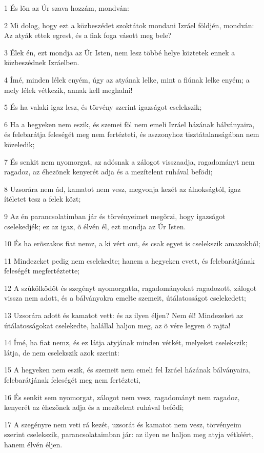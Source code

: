 \par 1 És lõn az Úr szava hozzám, mondván:
\par 2 Mi dolog, hogy ezt a közbeszédet szoktátok mondani Izráel földjén, mondván: Az atyák ettek egrest, és a fiak foga vásott meg bele?
\par 3 Élek én, ezt mondja az Úr Isten, nem lesz többé helye köztetek ennek a közbeszédnek Izráelben.
\par 4 Ímé, minden lélek enyém, úgy az atyának lelke, mint a fiúnak lelke enyém; a mely lélek vétkezik, annak kell meghalni!
\par 5 És ha valaki igaz lesz, és törvény szerint igazságot cselekszik;
\par 6 Ha a hegyeken nem eszik, és szemei föl nem emeli Izráel házának bálványaira, és felebarátja feleségét meg nem fertézteti,  és aszzonyhoz tisztátalanságában nem közeledik;
\par 7 És senkit nem nyomorgat, az adósnak a zálogot visszaadja,  ragadományt nem ragadoz, az éhezõnek kenyerét adja és a  mezítelent ruhával befödi;
\par 8 Uzsorára nem ád, kamatot nem vesz, megvonja kezét az álnokságtól, igaz ítéletet tesz a felek közt;
\par 9 Az én parancsolatimban jár és törvényeimet megõrzi, hogy igazságot cselekedjék; ez az igaz, õ élvén él, ezt mondja az Úr Isten.
\par 10 És ha erõszakos fiat nemz, a ki vért ont, és csak egyet is cselekszik amazokból;
\par 11 Mindezeket pedig nem cselekedte; hanem a hegyeken evett, és felebarátjának feleségét megfertéztette;
\par 12 A szûkölködõt és szegényt nyomorgatta, ragadományokat ragadozott, zálogot vissza nem adott, és a bálványokra emelte szemeit, útálatosságot cselekedett;
\par 13 Uzsorára adott és kamatot vett: és az ilyen éljen? Nem él! Mindezeket az útálatosságokat cselekedte, halállal haljon meg, az õ vére legyen õ rajta!
\par 14 Ímé, ha fiat nemz, és ez látja atyjának minden vétkét, melyeket cselekszik; látja, de nem cselekszik azok szerint:
\par 15 A hegyeken nem eszik, és szemeit nem emeli fel Izráel házának bálványaira, felebarátjának feleségét meg nem fertézteti,
\par 16 És senkit sem nyomorgat, zálogot nem vesz, ragadományt nem ragadoz, kenyerét az éhezõnek adja és a mezítelent ruhával befödi;
\par 17 A szegényre nem veti rá kezét, uzsorát és kamatot nem vesz, törvényeim szerint cselekszik, parancsolataimban jár: az ilyen ne haljon meg atyja vétkéért, hanem élvén éljen.
